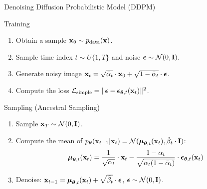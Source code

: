\documentclass{beamer}
\begin{document}
\begin{frame}{Denoising Diffusion Probabilistic Model (DDPM)}
    \begin{block}{Training}
        \begin{enumerate}
            \item Obtain a sample $\mathbf{x}_0 \sim p_{\text{data}}(\mathbf{x})$.
            \item Sample time index $t \sim U\{1, T\}$ and noise $\boldsymbol{\epsilon} \sim \mathcal{N}(0, \mathbf{I})$.
            \item Generate noisy image $\mathbf{x}_t = \sqrt{\bar{\alpha}_t} \cdot \mathbf{x}_0 + \sqrt{1 - \bar{\alpha}_t} \cdot \boldsymbol{\epsilon}$.
            \item Compute the loss $ \mathcal{L}_{\text{simple}} = \| \boldsymbol{\epsilon} - \boldsymbol{\epsilon}_{\boldsymbol{\theta}, t}(\mathbf{x}_t) \|^2 $.
        \end{enumerate}
    \end{block}
    \eqpause
    \begin{block}{Sampling (Ancestral Sampling)}
        \begin{enumerate}
            \item Sample $\mathbf{x}_T \sim \mathcal{N}(0, \mathbf{I})$.
            \item Compute the mean of $p_{\boldsymbol{\theta}}(\mathbf{x}_{t-1} | \mathbf{x}_t) = \mathcal{N}(\boldsymbol{\mu}_{\boldsymbol{\theta}, t}(\mathbf{x}_t), \tilde{\beta}_t \cdot \mathbf{I})$:
            \[
                \boldsymbol{\mu}_{\boldsymbol{\theta}, t}(\mathbf{x}_t) = \frac{1}{\sqrt{\alpha_t}} \cdot \mathbf{x}_t - \frac{1 - \alpha_t}{\sqrt{\alpha_t (1 - \bar{\alpha}_t)}} \cdot \boldsymbol{\epsilon}_{\boldsymbol{\theta}, t}(\mathbf{x}_t)
            \]
            \vspace{-0.3cm}
            \item Denoise: $\mathbf{x}_{t - 1} = \boldsymbol{\mu}_{\boldsymbol{\theta}, t}(\mathbf{x}_t) +  \sqrt{\tilde{\beta}_t} \cdot \boldsymbol{\epsilon}$, $\boldsymbol{\epsilon} \sim \mathcal{N}(0, \mathbf{I})$.
        \end{enumerate}
    \end{block}
\end{frame}
\end{document}
